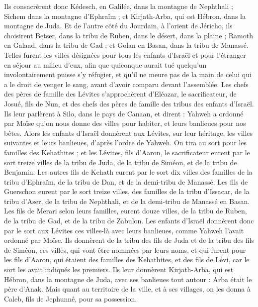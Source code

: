 \begin{multicols}{2}
Ils consacrèrent donc Kédesch, en Galilée, dans la montagne de Nephthali ; Sichem dans la montagne d’Ephraïm ; et Kirjath-Arba, qui est Hébron, dans la montagne de Juda.
Et de l’autre côté du Jourdain, à l’orient de Jéricho, ils choisirent Betser, dans la tribu de Ruben, dans le désert, dans la plaine ; Ramoth en Galaad, dans la tribu de Gad ; et Golan en Basan, dans la tribu de Manassé.
Telles furent les villes désignées pour tous les enfants d’Israël et pour l’étranger en séjour au milieu d’eux, afin que quiconque aurait tué quelqu’un involontairement puisse s’y réfugier, et qu’il ne meure pas de la main de celui qui a le droit de venger le sang, avant d’avoir comparu devant l’assemblée.
\VerseOne{}Les chefs des pères de famille des Lévites s’approchèrent d’Eléazar, le sacrificateur, de Josué, fils de Nun, et des chefs des pères de famille des tribus des enfants d’Israël.
Ils leur parlèrent à Silo, dans le pays de Canaan, et dirent : Yahweh a ordonné par Moïse qu’on nous donne des villes pour habiter, et leurs banlieues pour nos bêtes.
Alors les enfants d’Israël donnèrent aux Lévites, sur leur héritage, les villes suivantes et leurs banlieues, d’après l’ordre de Yahweh.
On tira au sort pour les familles des Kehathites ; et les Lévites, fils d’Aaron, le sacrificateur eurent par le sort treize villes de la tribu de Juda, de la tribu de Siméon, et de la tribu de Benjamin.
Les autres fils de Kehath eurent par le sort dix villes des familles de la tribu d’Ephraïm, de la tribu de Dan, et de la demi-tribu de Manassé.
Les fils de Guerschon eurent par le sort treize villes, des familles de la tribu d’Issacar, de la tribu d’Aser, de la tribu de Nephthali, et de la demi-tribu de Manassé en Basan.
Les fils de Merari selon leurs familles, eurent douze villes, de la tribu de Ruben, de la tribu de Gad, et de la tribu de Zabulon.
Les enfants d’Israël donnèrent donc par le sort aux Lévites ces villes-là avec leurs banlieues, comme Yahweh l’avait ordonné par Moïse.
Ils donnèrent de la tribu des fils de Juda et de la tribu des fils de Siméon, ces villes, qui vont être nommées par leurs noms,
et qui furent pour les fils d’Aaron, qui étaient des familles des Kehathites, et des fils de Lévi, car le sort les avait indiqués les premiers.
Ils leur donnèrent Kirjath-Arba, qui est Hébron, dans la montagne de Juda, avec ses banlieues tout autour : Arba était le père d’Anak.
Mais quant au territoire de la ville, et à ses villages, on les donna à Caleb, fils de Jephunné, pour sa possession.

\end{multicols}

